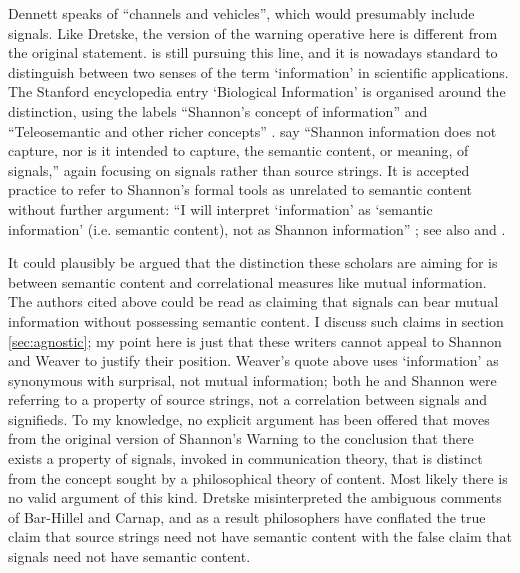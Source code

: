 \documentclass[12pt]{article}
\begin{document}
\noindent Dennett speaks of ``channels and vehicles'', which would presumably include signals.
Like Dretske, the version of the warning operative here is different from the original statement.
\citet[$\S$6]{dennett2017bacteria} is still pursuing this line, and it is nowadays standard to distinguish between two senses of the term `information' in scientific applications.
The Stanford encyclopedia entry `Biological Information' is organised around the distinction, using the labels ``Shannon's concept of information'' and ``Teleosemantic and other richer concepts'' \citep{godfrey-smith2016biological}.
\citet[21]{piccinini2011information} say ``Shannon information does not capture, nor is it intended to capture, the semantic content, or meaning, of signals,'' again focusing on signals rather than source strings.
It is accepted practice to refer to Shannon's formal tools as unrelated to semantic content without further argument: ``I will interpret ‘information’ as ‘semantic information’ (i.e. semantic content), not as Shannon information'' \citep[p. 12 n. 14]{artiga2020signals}; see also \citet[6]{cao2020new} and \citet[1]{kolchinsky2018semantic}.

It could plausibly be argued that the distinction these scholars are aiming for is between semantic content and correlational measures like mutual information.
The authors cited above could be read as claiming that signals can bear mutual information without possessing semantic content.
I discuss such claims in section \ref{sec:agnostic}; my point here is just that these writers cannot appeal to Shannon and Weaver to justify their position.
Weaver's quote above uses `information' as synonymous with surprisal, not mutual information; both he and Shannon were referring to a property of source strings, not a correlation between signals and signifieds.
To my knowledge, no explicit argument has been offered that moves from the original version of {\sc Shannon's Warning} to the conclusion that there exists a property of signals, invoked in communication theory, that is distinct from the concept sought by a philosophical theory of content.
Most likely there is no valid argument of this kind.
Dretske misinterpreted the ambiguous comments of Bar-Hillel and Carnap, and as a result philosophers have conflated the true claim that source strings need not have semantic content with the false claim that signals need not have semantic content.
\end{document}
